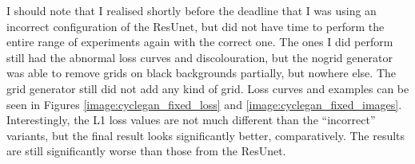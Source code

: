 I should note that I realised shortly before the deadline that I was using an incorrect configuration of the ResUnet, but did not have time to perform the entire range of experiments again with the correct one. The ones I did perform still had the abnormal loss curves and discolouration, but the nogrid generator was able to remove grids on black backgrounds partially, but nowhere else. The grid generator still did not add any kind of grid. Loss curves and examples can be seen in Figures \ref{image:cyclegan_fixed_loss} and \ref{image:cyclegan_fixed_images}. Interestingly, the L1 loss values are not much different than the ``incorrect'' variants, but the final result looks significantly better, comparatively. The results are still significantly worse than those from the ResUnet.
